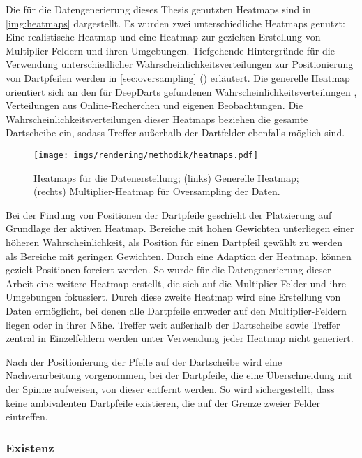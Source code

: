 Die für die Datengenerierung dieses Thesis genutzten Heatmaps sind in \autoref{img:heatmaps} dargestellt. Es wurden zwei unterschiedliche Heatmaps genutzt: Eine realistische Heatmap und eine Heatmap zur gezielten Erstellung von Multiplier-Feldern und ihren Umgebungen. Tiefgehende Hintergründe für die Verwendung unterschiedlicher Wahrscheinlichkeitsverteilungen zur Positionierung von Dartpfeilen werden in \autoref{sec:oversampling} () erläutert. Die generelle Heatmap orientiert sich an den für DeepDarts gefundenen Wahrscheinlichkeitsverteilungen \cite{deepdarts}, Verteilungen aus Online-Recherchen \cite{heatmap} und eigenen Beobachtungen. Die Wahrscheinlichkeitsverteilungen dieser Heatmaps beziehen die gesamte Dartscheibe ein, sodass Treffer außerhalb der Dartfelder ebenfalls möglich sind.

\begin{figure}
    \centering
    \texttt{[image: imgs/rendering/methodik/heatmaps.pdf]}
    \caption{Heatmaps für die Datenerstellung; (links) Generelle Heatmap; (rechts) Multiplier-Heatmap für Oversampling der Daten.}
    \label{img:heatmaps}
\end{figure}

Bei der Findung von Positionen der Dartpfeile geschieht der Platzierung auf Grundlage der aktiven Heatmap. Bereiche mit hohen Gewichten unterliegen einer höheren Wahrscheinlichkeit, als Position für einen Dartpfeil gewählt zu werden als Bereiche mit geringen Gewichten. Durch eine Adaption der Heatmap, können gezielt Positionen forciert werden. So wurde für die Datengenerierung dieser Arbeit eine weitere Heatmap erstellt, die sich auf die Multiplier-Felder und ihre Umgebungen fokussiert. Durch diese zweite Heatmap wird eine Erstellung von Daten ermöglicht, bei denen alle Dartpfeile entweder auf den Multiplier-Feldern liegen oder in ihrer Nähe. Treffer weit außerhalb der Dartscheibe sowie Treffer zentral in Einzelfeldern werden unter Verwendung jeder Heatmap nicht generiert.

Nach der Positionierung der Pfeile auf der Dartscheibe wird eine Nachverarbeitung vorgenommen, bei der Dartpfeile, die eine Überschneidung mit der Spinne aufweisen, von dieser entfernt werden. So wird sichergestellt, dass keine ambivalenten Dartpfeile existieren, die auf der Grenze zweier Felder eintreffen.

\subsubsection{Existenz}

